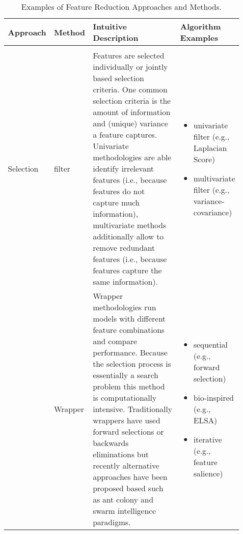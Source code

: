 \begin{sidewaystable}
    \centering
    \caption{Examples of Feature Reduction Approaches and Methods.}
    \label{tab:featureReduction} 
    \begin{tabular}{
    >{\raggedright\arraybackslash}p{0.08\linewidth} 
    >{\raggedright\arraybackslash}p{0.08\linewidth} 
    >{\raggedright\arraybackslash}p{0.54\linewidth} 
    >{\raggedright\arraybackslash}p{0.25\linewidth}
    }
        \hline 
        Approach & Method & Intuitive Description & Algorithm Examples \\ 
        \hline \\ [-0.5em]
        
        Selection \linebreak & 
        filter \linebreak & 
        Features are selected individually or jointly based selection criteria. One common selection criteria is the amount of information and (unique) variance a feature captures. Univariate methodologies are able identify irrelevant features (i.e., because features do not capture much information), multivariate methods additionally allow to remove redundant features (i.e., because features capture the same information). \linebreak &
        \vspace{-1em}
        \begin{itemize}[nosep,leftmargin=*,label={--}]
            \item univariate filter (e.g., Laplacian Score)
            \item multivariate filter (e.g., variance-covariance)
        \end{itemize}
         \linebreak \\ 
        
        \linebreak & 
        Wrapper \linebreak & 
        Wrapper methodologies run models with different feature combinations and compare performance. Because the selection process is essentially a search problem this method is computationally intensive. Traditionally wrappers have used forward selections or backwards eliminations but recently alternative approaches have been proposed based such as ant colony and swarm intelligence paradigms. \linebreak &
        \vspace{-1em}
        \begin{itemize}[nosep,leftmargin=*,label={--}]
            \item sequential (e.g., forward selection)
            \item bio-inspired (e.g., ELSA)
            \item iterative (e.g., feature salience)
        \end{itemize}
         \linebreak \\ 
        

\end{tabular}
\end{sidewaystable}
